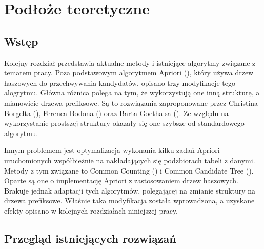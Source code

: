 \chapter{Podłoże teoretyczne}
\label{c3}

\section{Wstęp}
\label{c31}
Kolejny rozdział przedstawia aktualne metody i istniejące algorytmy związane z tematem pracy. Poza podstawowym algorytmem Apriori (\cite{Agrawal}), który używa drzew haszowych do przechwywania kandydatów, opisano trzy modyfikacje tego alogrytmu. Główna różnica polega na tym, że wykorzystują one inną strukturę, a mianowicie drzewa prefiksowe. Są to rozwiązania zaproponowane przez Christina Borgelta (\cite{Borgelt}), Ferenca Bodona (\cite{Bodon}) oraz Barta Goethalsa (\cite{Goethals}). Ze względu na wykorzystanie prostszej struktury okazały się one szybsze od standardowego algorytmu.
 
Innym problemem jest optymalizacja wykonania kilku zadań Apriori uruchomionych współbieżnie na nakładających się podzbiorach tabeli z danymi. Metody z tym związane to Common Counting (\cite{WojciechowskiCC}) i Common Candidate Tree (\cite{WojciechowskiCCT}). Oparte są one o implementację Apriori z zastosowaniem drzew haszowych. Brakuje jednak adaptacji tych algorytmów, polegającej na zmianie struktury na drzewa prefiksowe. Właśnie taka modyfikacja została wprowadzona, a uzyskane efekty opisano w kolejnych rozdziałach niniejszej pracy. 


\section{Przegląd istniejących rozwiązań}
\label{c32}


